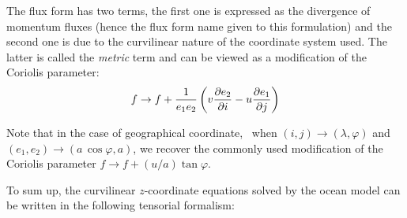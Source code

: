 \documentclass[../main/NEMO_manual]{subfiles}
\begin{document}
The flux form has two terms,
the first one is expressed as the divergence of momentum fluxes
(hence the flux form name given to this formulation) and
the second one is due to the curvilinear nature of the coordinate system used.
The latter is called the \textit{metric} term and can be viewed as
a modification of the Coriolis parameter:
\[
  f \to f + \frac{1}{e_1 e_2} \lt( v \pd[e_2]{i} - u \pd[e_1]{j} \rt)
\]

Note that in the case of geographical coordinate,
\ie\ when $(i,j) \to (\lambda,\varphi)$ and $(e_1,e_2) \to (a \, \cos \varphi,a)$,
we recover the commonly used modification of the Coriolis parameter $f \to f + (u / a) \tan \varphi$.

To sum up, the curvilinear $z$-coordinate equations solved by the ocean model can be written in
the following tensorial formalism:
\end{document}
